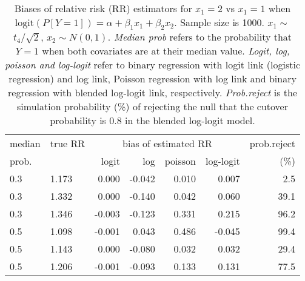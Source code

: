 \documentclass[12pt,a4paper]{article}
\begin{document}
\begin{table}[H] 
\small\sf\centering 
\caption{Biases of relative risk (RR) estimators for $x_1=2$ vs $x_1=1$ when $\mbox{logit}(P[Y=1])=\alpha+\beta_1 x_1 + \beta_2 x_2$. Sample size is 1000. $x_1 \sim $$t_4/\sqrt{2}$, $x_2 \sim N(0,1)$. {\it Median prob} refers to the probability that $Y=1$ when both covariates are at their median value. {\it Logit, log, poisson and log-logit} refer to binary regression with logit link (logistic regression) and log link, Poisson regression with log link and binary regression with blended log-logit link, respectively. {\it Prob.reject} is the simulation probability (\%) of rejecting the null that the cutover probability is $0.8$ in the blended log-logit model.} 
\begin{tabular}{llrrrrr} 
\toprule 
median & true RR & \multicolumn{4}{c}{bias of estimated RR} & prob.reject \\ 
prob. & & logit & log & poisson & log-logit  & (\%) \\ \midrule 
0.3 & 1.173 &  0.000 & -0.042 & 0.010 &  0.007 &  2.5 \\  
0.3 & 1.332 &  0.000 & -0.140 & 0.042 &  0.060 & 39.1 \\  
0.3 & 1.346 & -0.003 & -0.123 & 0.331 &  0.215 & 96.2 \\  
0.5 & 1.098 & -0.001 &  0.043 & 0.486 & -0.045 & 99.4 \\  
0.5 & 1.143 &  0.000 & -0.080 & 0.032 &  0.032 & 29.4 \\  
0.5 & 1.206 & -0.001 & -0.093 & 0.133 &  0.131 & 77.5 \\  
\bottomrule 
\end{tabular} 
\end{table} 
\end{document}
